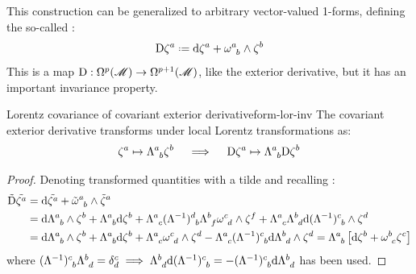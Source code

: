 This construction can be generalized to arbitrary vector-valued 1-forms, defining the so-called :
\begin{equation}
  \dcov \zeta^a \defeq \dd \zeta^a + \tensor{\omega}{^a_b} \wedge \zeta^b
\end{equation}
This is a map $ \mathrm{D} : \Omega^{p}(\mathscr{M}) \rightarrow \Omega^{p+1}(\mathscr{M}) $, like the exterior derivative, but it has an important invariance property.

\begin{lemma}{Lorentz covariance of covariant exterior derivative}{form-lor-inv}
  The covariant exterior derivative transforms under local Lorentz transformations as:
  \begin{equation}
    \zeta^a \mapsto \tensor{\Lambda}{^a_b} \zeta^b
    \quad \implies \quad
    \dcov \zeta^a \mapsto \tensor{\Lambda}{^a_b} \dcov \zeta^b
  \end{equation}
\end{lemma}

\begin{proofbox}
  \begin{proof}
    Denoting transformed quantities with a tilde and recalling :
    \begin{equation*}
      \begin{split}
        \tilde{\dcov} \tilde{\zeta^a}
        & = \dd \tilde{\zeta^a} + \tensor{\tilde{\omega}}{^a_b} \wedge \tilde{\zeta}^a \\
        & = \dd \tensor{\Lambda}{^a_b} \wedge \zeta^b + \tensor{\Lambda}{^a_b} \dd \zeta^b + \tensor{\Lambda}{^a_c} \tensor{(\Lambda^{-1})}{^d_b} \tensor{\Lambda}{^b_f} \tensor{\omega}{^c_d} \wedge \zeta^f + \tensor{\Lambda}{^a_c} \tensor{\Lambda}{^b_d} \dd \tensor{(\Lambda^{-1})}{^c_b} \wedge \zeta^d \\
        & = \dd \tensor{\Lambda}{^a_b} \wedge \zeta^b + \tensor{\Lambda}{^a_b} \dd \zeta^b + \tensor{\Lambda}{^a_c} \tensor{\omega}{^c_d} \wedge \zeta^d - \tensor{\Lambda}{^a_c} \tensor{(\Lambda^{-1})}{^c_b} \dd \tensor{\Lambda}{^b_d} \wedge \zeta^d = \tensor{\Lambda}{^a_b} \left[ \dd \zeta^b + \tensor{\omega}{^b_c} \zeta^c \right]
      \end{split}
    \end{equation*}
    where $ \tensor{(\Lambda^{-1})}{^c_b} \tensor{\Lambda}{^b_d} = \delta^c_d \implies \tensor{\Lambda}{^b_d} \dd \tensor{(\Lambda^{-1})}{^c_b} = - \tensor{(\Lambda^{-1})}{^c_b} \dd \tensor{\Lambda}{^b_d} $ has been used.
  \end{proof}
\end{proofbox}

